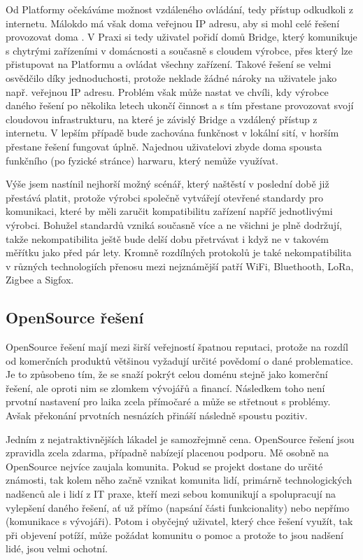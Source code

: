 Od Platformy očekáváme možnost vzdáleného ovládání, tedy přístup odkudkoli z internetu. Málokdo má však doma veřejnou IP adresu, aby si mohl celé řešení provozovat doma . V Praxi si tedy uživatel pořidí domů Bridge, který komunikuje s chytrými zařízeními v domácnosti a současně s cloudem výrobce, přes který lze přistupovat na Platformu a ovládat všechny zařízení. Takové řešení se velmi osvědčilo díky jednoduchosti, protože neklade žádné nároky na uživatele jako např. veřejnou IP adresu. Problém však může nastat ve chvíli, kdy výrobce daného řešení po několika letech ukončí činnost a s tím přestane provozovat svojí cloudovou infrastrukturu, na které je závislý Bridge a vzdálený přístup z internetu. V lepším případě bude zachována funkčnost v lokální sití, v horším přestane řešení fungovat úplně. Najednou uživatelovi zbyde doma spousta funkčního (po fyzické stránce) harwaru, který nemůže využívat.

Výše jsem nastínil nejhorší možný scénář, který naštěstí v poslední době již přestává platit, protože výrobci společně vytvářejí otevřené standardy pro komunikaci, které by měli zaručit kompatibilitu zařízení napříč jednotlivými výrobci. Bohužel standardů vzniká současně více a ne všichni je plně dodržují, takže nekompatibilita ještě bude delší dobu přetrvávat i když ne v takovém měřítku jako před pár lety. Kromně rozdílných protokolů je také nekompatibilita v různých technologiích přenosu mezi nejznámější patří WiFi, Bluethooth, LoRa, Zigbee a Sigfox.

\subsection{OpenSource řešení}
OpenSource řešení mají mezi širší veřejností špatnou reputaci, protože na rozdíl od komerčních  produktů většinou vyžadují určité povědomí o dané problematice. Je to způsobeno tím, že se snaží pokrýt celou doménu stejně jako komerční řešení, ale oproti nim se zlomkem vývojářů a financí. Následkem toho není prvotní nastavení pro laika zcela přímočaré a může se střetnout s problémy. Avšak překonání prvotních nesnázích přináší následně spoustu pozitiv.

Jedním z nejatraktivnějších lákadel je samozřejmně cena. OpenSource řešení jsou zpravidla zcela zdarma, případně nabízejí placenou podporu. Mě osobně na OpenSource nejvíce zaujala komunita. Pokud se projekt dostane do určité známosti, tak kolem něho začně vznikat komunita lidí, primárně technologických nadšenců ale i lidí z IT praxe, kteří mezi sebou komunikují a spolupracují na vylepšení daného řešení, ať už přímo (napsání části funkcionality) nebo nepřímo (komunikace s vývojáři). Potom i obyčejný uživatel, který chce řešení využít, tak při objevení potíží, může požádat komunitu o pomoc a protože to jsou nadšení lidé, jsou velmi ochotní.

